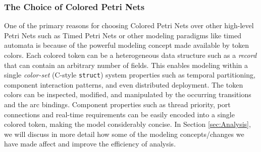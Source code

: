 \subsubsection{The Choice of Colored Petri Nets}
One of the primary reasons for choosing Colored Petri Nets over other high-level Petri Nets such as Timed Petri Nets or other modeling paradigms like timed automata is because of the powerful modeling concept made available by token colors. Each colored token can be a heterogeneous data structure such as a \emph{record} that can contain an arbitrary number of fields. This enables modeling within a single \emph{color-set} (C-style \texttt{struct}) system properties such as temporal partitioning, component interaction patterns, and even distributed deployment. The token colors can be inspected, modified, and manipulated by the occurring transitions and the arc bindings. Component properties such as thread priority, port connections and real-time requirements can be easily encoded into a single colored token, making the model considerably concise. In Section \ref{sec:Analysis}, we will discuss in more detail how some of the modeling concepts/changes we have made affect and improve the efficiency of analysis.